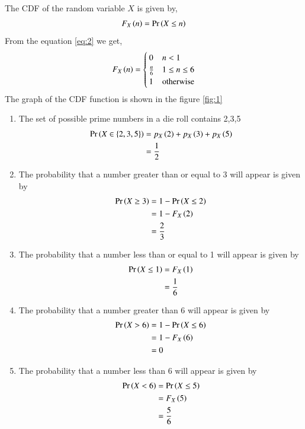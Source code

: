 \documentclass[journal,12pt,twocolumn]{IEEEtran}
\begin{document}
\begin{enumerate}
The CDF of the random variable $X$ is given by,
\begin{align}
F_{X}\left(n\right) = 	\Pr\left(X \le n\right) \label{eq:2}
\end{align}
From the equation \eqref{eq:2} we get,
\begin{align}
F_{X}\left(n\right) = 
\begin{cases}
0 & n < 1 \\
\frac{n}{6} & 1 \le n \leq 6 \\
1 & \text{otherwise}
\end{cases}
\end{align}
The graph of the CDF function is shown in the figure \ref{fig:1}
\begin{enumerate}
\item The set of possible prime numbers in a die roll contains 2,3,5
\begin{align} 
\Pr\left(X \in \{2,3,5\}\right) &= p_{X}\left(2\right) + p_{X}\left(3\right) + p_{X}\left(5\right)\\
&= \frac{1}{2}
\end{align}
\item The probability that a number greater than or equal to 3 will appear is given by
\begin{align}
\Pr\left(X \geq 3\right) &= 1 - \Pr\left(X \leq 2\right)\\
&= 1 - F_{X}\left(2\right)\\
&= \frac{2}{3}
\end{align}
\item The probability that a number less than or equal to 1 will appear is given by
\begin{align}
\Pr\left(X \leq 1\right) &= F_{X}\left(1\right)\\
&= \frac{1}{6}
\end{align}
\item The probability that a number greater than 6 will appear is given by
\begin{align}
\Pr\left(X > 6\right) &= 1 - \Pr\left(X \leq 6\right)\\
&= 1 - F_{X}\left(6\right)\\
&= 0
\end{align}
\item The probability that a number less than 6 will appear is given by
\begin{align}
\Pr\left(X < 6\right) &= \Pr\left(X \leq 5\right)\\
&= F_{X}\left(5\right)\\
&= \frac{5}{6}
\end{align}
\end{enumerate}
\end{enumerate}
\end{document}
